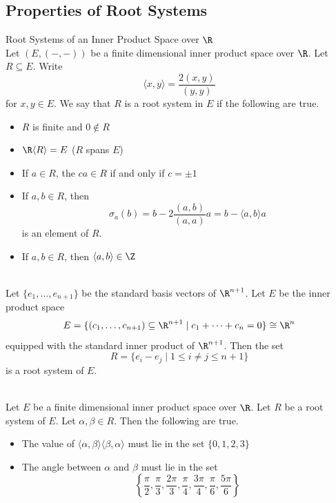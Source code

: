 \documentclass[a4paper]{article}
\begin{document}
\subsection{Properties of Root Systems}
\begin{defn}{Root Systems of an Inner Product Space over $\R$}{} \\Let $(E,(-,-))$ be a finite dimensional inner product space over $\R$. Let $R\subseteq E$. Write $$\langle x,y\rangle=\frac{2(x,y)}{(y,y)}$$ for $x,y\in E$. We say that $R$ is a root system in $E$ if the following are true. 
\begin{itemize}
\item $R$ is finite and $0\notin R$
\item $\R\langle R\rangle=E$ ($R$ spans $E$)
\item If $a\in R$, the $ca\in R$ if and only if $c=\pm1$
\item If $a,b\in R$, then $$\sigma_a(b)=b-2\frac{(a,b)}{(a,a)}a=b-\langle a,b\rangle a$$ is an element of $R$. 
\item If $a,b\in R$, then $\langle a,b\rangle\in\Z$
\end{itemize}
\end{defn}

\begin{eg}{}{} \\Let $\{e_1,\dots,e_{n+1}\}$ be the standard basis vectors of $\R^{n+1}$. Let $E$ be the inner product space $$E=\{(c_1,\dots,c_{n+1})\subseteq\R^{n+1}\;|\;c_1+\dots+c_n=0\}\cong\R^n$$ equipped with the standard inner product of $\R^{n+1}$. Then the set $$R=\{e_i-e_j\;|\;1\leq i\neq j\leq n+1\}$$ is a root system of $E$. 
\end{eg}

\begin{lmm}{}{} \\Let $E$ be a finite dimensional inner product space over $\R$. Let $R$ be a root system of $E$. Let $\alpha,\beta\in R$. Then the following are true. 
\begin{itemize}
\item The value of $\langle\alpha,\beta\rangle\langle\beta,\alpha\rangle$ must lie in the set $\{0,1,2,3\}$
\item The angle between $\alpha$ and $\beta$ must lie in the set $$\left\{\frac{\pi}{2},\frac{\pi}{3},\frac{2\pi}{3},\frac{\pi}{4},\frac{3\pi}{4},\frac{\pi}{6},\frac{5\pi}{6}\right\}$$
\end{itemize}
\end{lmm}
\end{document}
